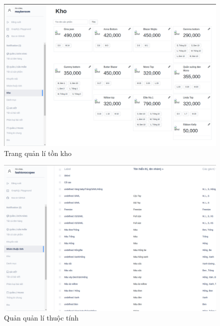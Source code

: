 \begin{figure}[!htbp]
	\begin{center}	
		\includegraphics[width=\textwidth]{./results/stock}
		\caption{Trang quản lí tồn kho}
	\end{center}
\end{figure}
\clearpage
\FloatBarrier
\begin{figure}[!htbp]
	\begin{center}	
		\includegraphics[width=\textwidth]{./results/attributes}
		\caption{Quản quản lí thuộc tính}
	\end{center}
\end{figure}
\clearpage
\FloatBarrier

